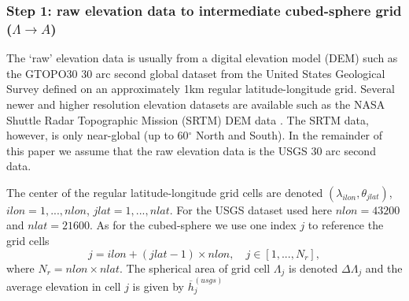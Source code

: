 \documentclass[gmd]{copernicus}
\begin{document}
\subsubsection{Step 1: raw elevation data to intermediate cubed-sphere grid ($\Lambda \rightarrow A$)}\label{sec:step1}
The `raw' elevation data is usually from a digital elevation model (DEM) such as the GTOPO30 30 arc second global dataset from the United States Geological Survey \citep[USGS][]{USGS} defined on an approximately 1km regular latitude-longitude grid. Several newer and higher resolution elevation datasets are available such as the NASA Shuttle Radar Topographic Mission (SRTM) DEM data \citep{SRTM}. The SRTM data, however, is only near-global (up to 60$^\circ$ North and South). In the remainder of this paper we assume that the raw elevation data is the USGS 30 arc second data.

The center of the regular latitude-longitude grid cells are denoted $(\lambda_{ilon},\theta_{jlat})$, $ilon=1,..., nlon$, $jlat=1, ..., nlat$. For the USGS dataset used here $nlon=43200$ and $nlat=21600$. As for the cubed-sphere we use one index $j$ to reference the grid cells
\begin{equation}
j=ilon+(jlat-1)\times nlon, \quad j\in [1, ..., N_r],
\end{equation} 
where $N_r=nlon\times nlat$. The spherical area of grid cell $\Lambda_j$ is denoted $\Delta \Lambda_j$ and the average elevation in cell $j$ is given by $\overline{h}^{(usgs)}_j$ 
\end{document}
